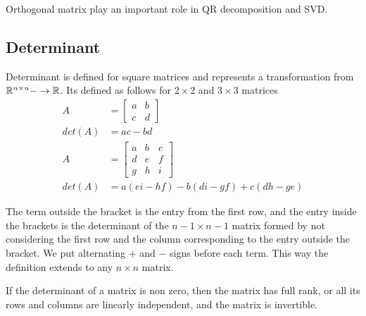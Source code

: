 \documentclass[../../linear_algebra.tex]{subfiles}
\begin{document}
Orthogonal matrix play an important role in QR decomposition and SVD.

\subsection{Determinant}
Determinant is defined for square matrices and represents a transformation from $\mathbb{R}^{n \times n} -\to \mathbb{R}$. Its defined as follows for $2 \times 2$ and $3 \times 3$ matrices
\begin{align*}
    A &= \begin{bmatrix}
        a &b\\ c &d
    \end{bmatrix}\\
    det(A) &= ac - bd\\
    A &= \begin{bmatrix}
        a &b &c\\ d &e &f\\ g &h &i
    \end{bmatrix}\\
    det(A) &= a(ei-hf) - b(di - gf) + c(dh - ge)
\end{align*}

The term outside the bracket is the entry from the first row, and the entry inside the brackets is the determinant of the $n-1 \times n-1$ matrix formed by not considering the first row and the column corresponding to the entry outside the bracket. We put alternating $+$ and $-$ signs before each term. This way the definition extends to any $n \times n$ matrix.\newline

If the determinant of a matrix is non zero, then the matrix has full rank, or all its rows and columns are linearly independent, and the matrix is invertible.
\end{document}
